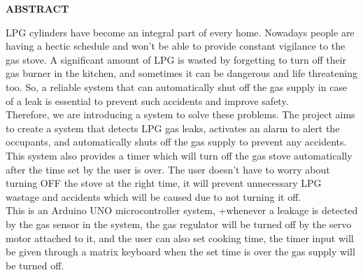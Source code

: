 \documentclass[a4paper,12pt]{report}
\let\mtcontentsname\contentsname
\renewcommand\contentsname{\MakeUppercase\mtcontentsname}
\begin{document}
\begin{center}
    \Large\textbf{ABSTRACT}  
\end{center} 
\vspace{1cm}
LPG cylinders have become an integral part of every home. Nowadays people are having a hectic
schedule and won't be able to provide constant vigilance to the gas stove. A significant amount of
LPG is wasted by forgetting to turn off their gas burner in the kitchen, and sometimes it can be
dangerous and life threatening too. So, a reliable system that can automatically shut off the gas
supply in case of a leak is essential to prevent such accidents and improve safety. \\
Therefore, we are introducing a system to solve these problems. The project aims to create a system
that detects LPG gas leaks, activates an alarm to alert the occupants, and automatically shuts off
the gas supply to prevent any accidents. This system also provides a timer which will turn off the
gas stove automatically after the time set by the user is over. The user doesn’t have to worry about
turning OFF the stove at the right time, it will prevent unnecessary LPG wastage and accidents
which will be caused due to not turning it off.\\
This is an Arduino UNO microcontroller system, +whenever a leakage is detected by the gas sensor
in the system, the gas regulator will be turned off by the servo motor attached to it, and the user
can also set cooking time, the timer input will be given through a matrix keyboard when the set
time is over the gas supply will be turned off.
\vspace{0.5cm}

\clearpage
\newpage
\tableofcontents
\renewcommand*\contentsname{CONTENTS}

\newpage
\renewcommand{\listfigurename}{LIST OF FIGURES}

\listoffigures
{}

\newpage
\renewcommand{\listtablename}{LIST OF TABLES}




\newpage
\end{document}
